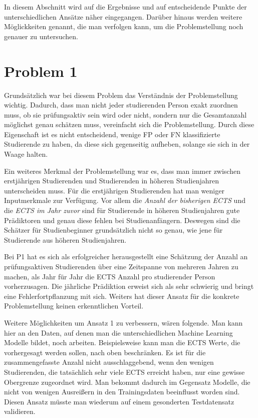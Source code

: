 In diesem Abschnitt wird auf die Ergebnisse und auf entscheidende Punkte der unterschiedlichen Ans\"atze n\"aher eingegangen.
Dar\"uber hinaus werden weitere M\"oglickkeiten genannt, die man verfolgen kann, um die Problemstellung noch genauer zu untersuchen.






\section{Problem 1}

Grunds\"atzlich war bei diesem Problem das Verst\"andnis der Problemstellung wichtig. Dadurch, dass man nicht jeder studierenden Person exakt zuordnen muss,
ob sie pr\"ufungsaktiv sein wird oder nicht, sondern nur die Gesamtanzahl m\"oglichst genau sch\"atzen muss, vereinfacht sich die Problemstellung.
Durch diese Eigenschaft ist es nicht entscheidend, wenige FP oder FN klassifizierte Studierende zu haben, da diese sich gegenseitig aufheben, solange sie sich in der
Waage halten.

Ein weiteres Merkmal der Problemstellung war es, dass man immer zwischen erstj\"ahrigen Studierenden und Studierenden in h\"oheren Studienjahren unterscheiden muss.
F\"ur die erstj\"ahrigen Studierenden hat man weniger Inputmerkmale zur Verf\"ugung. Vor allem die \textit{Anzahl der bisherigen ECTS} und die \textit{ECTS im Jahr zuvor} sind f\"ur
Studierende in h\"oheren Studienjahren gute Pr\"adiktoren und genau diese fehlen bei Studienanf\"angern. Deswegen sind die Sch\"atzer f\"ur Studienbeginner grunds\"atzlich
nicht so genau, wie jene f\"ur Studierende aus h\"oheren Studienjahren.

Bei P1 hat es sich als erfolgreicher herausgestellt eine Sch\"atzung der Anzahl an pr\"ufungsaktiven Studierenden \"uber eine Zeitspanne von mehreren
Jahren zu machen, als Jahr f\"ur Jahr die ECTS Anzahl pro studierender Person vorherzusagen. Die j\"ahrliche Pr\"adiktion erweist sich als
sehr schwierig und bringt eine Fehlerfortpflanzung mit sich. Weiters hat dieser Ansatz f\"ur die konkrete Problemstellung keinen erkenntlichen Vorteil.

Weitere M\"oglichkeiten um Ansatz 1 zu verbessern, w\"aren folgende. Man kann hier an den Daten, auf denen man die unterschiedlichen Machine Learning
Modelle bildet, noch arbeiten. Beispielsweise kann man die ECTS Werte, die vorhergesagt werden sollen, nach oben beschr\"anken. Es ist f\"ur die
zusammengefasste Anzahl nicht ausschlaggebend, wenn den wenigen Studierenden, die tats\"achlich sehr viele ECTS erreicht haben, nur eine gewisse Obergrenze zugeordnet wird.
Man bekommt dadurch im Gegensatz Modelle, die nicht von wenigen Ausrei{\ss}ern in den Trainingsdaten beeinflusst worden sind. Diesen Ansatz m\"usste man wiederum
auf einem gesonderten Testdatensatz validieren.

